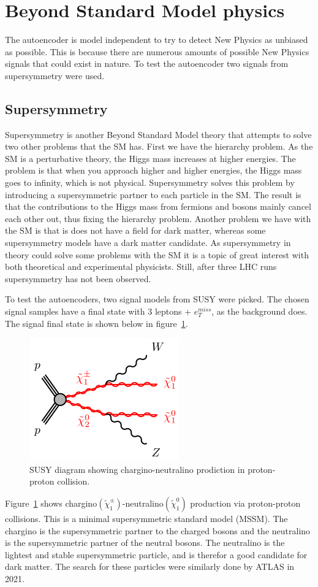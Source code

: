 \section{Beyond Standard Model physics}
The autoencoder is model independent to try to detect New Physics as unbiased as possible. This is because there are 
numerous amounts of possible New Physics signals that could exist in nature. To test the autoencoder two 
signals from supersymmetry were used.
\subsection*{Supersymmetry}
Supersymmetry is another Beyond Standard Model theory that attempts to solve two other problems that the SM has. 
First we have the hierarchy problem. As the SM is a perturbative theory, the Higgs mass increases at 
higher energies. The problem is that when you approach higher and higher energies, the Higgs mass goes to infinity, 
which is not physical. Supersymmetry solves this problem by introducing a supersymmetric partner to each particle
in the SM. The result is that the contributions to the Higgs mass from fermions and bosons mainly cancel each other out, 
thus fixing the hierarchy problem. Another problem we have with the SM
is that is does not have a field for dark matter, whereas some supersymmetry models have a dark matter candidate.
As supersymmetry in theory could solve some problems with the SM it is a topic of great interest with both theoretical and 
experimental physicists. Still, after three LHC runs supersymmetry has not been observed\cite{atlas_search_2021}. \par 

To test the autoencoders, two signal models from SUSY were picked. The chosen signal samples have a final state with 3 leptons + $e_T^{miss}$,
as the background does. The signal final state is shown below in figure \ref{fig:sysy_feyn}. 

\begin{figure}[H]
    \centering
    \includegraphics[width=0.4\linewidth]{Figures/susy/C1N2-WZN1N1.png}
    \caption[SUSY feynman diagram]{SUSY diagram showing chargino-neutralino prodiction in proton-proton collision. }
    \label{fig:sysy_feyn}
\end{figure}

Figure \ref{fig:sysy_feyn} shows chargino$(\tilde{\chi}_1^{\pm})$-neutralino$(\tilde{\chi}_1^{0})$ production via proton-proton collisions. 
This is a minimal supersymmetric standard model (MSSM). The chargino is the supersymmetric partner 
to the charged bosons and the neutralino is the supersymmetric partner of the neutral bosons. The neutralino
is the lightest and stable supersymmetric particle, and is therefor a good candidate for dark matter. 
The search for these particles were similarly done by ATLAS in 2021\cite{atlas_search_2021}. 